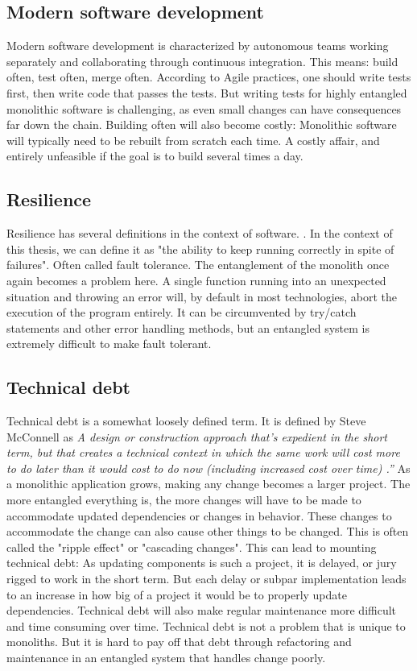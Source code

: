 \subsection{Modern software development}
Modern software development is characterized by autonomous teams working separately and collaborating through continuous integration. 
This means: build often, test often, merge often. 
According to Agile practices, one should write tests first, then write code that passes the tests. 
But writing tests for highly entangled monolithic software is challenging, as even small changes can have consequences far down the chain. 
Building often will also become costly: Monolithic software will typically need to be rebuilt from scratch each time. 
A costly affair, and entirely unfeasible if the goal is to build several times a day. 

\subsection{Resilience}
Resilience has several definitions in the context of software. \cite*{Curtis}. 
In the context of this thesis, we can define it as "the ability to keep running correctly in spite of failures". Often called fault tolerance.
The entanglement of the monolith once again becomes a problem here. 
A single function running into an unexpected situation and throwing an error will, by default in most technologies, abort the execution of the program entirely.
It can be circumvented by try/catch statements and other error handling methods, but an entangled system is extremely difficult to make fault tolerant.

\subsection{Technical debt} 
Technical debt is a somewhat loosely defined term. It is defined by Steve McConnell as \textit{A
design or construction approach that's expedient in the short term, but
that creates a technical context in which the same work will cost more
to do later than it would cost to do now (including increased cost over
time) \cite*{McConnell2013}.”}
As a monolithic application grows, making any change becomes a larger project.
The more entangled everything is, the more changes will have to be made to accommodate updated dependencies or changes in behavior. 
These changes to accommodate the change can also cause other things to be changed.
This is often called the "ripple effect" or "cascading changes". 
This can lead to mounting technical debt: As updating components is such a project, it is delayed, or jury rigged to work in the short term.
But each delay or subpar implementation leads to an increase in how big of a project it would be to properly update dependencies.
Technical debt will also make regular maintenance more difficult and time consuming over time. 
Technical debt is not a problem that is unique to monoliths. 
But it is hard to pay off that debt through refactoring and maintenance in an entangled system that handles change poorly.

